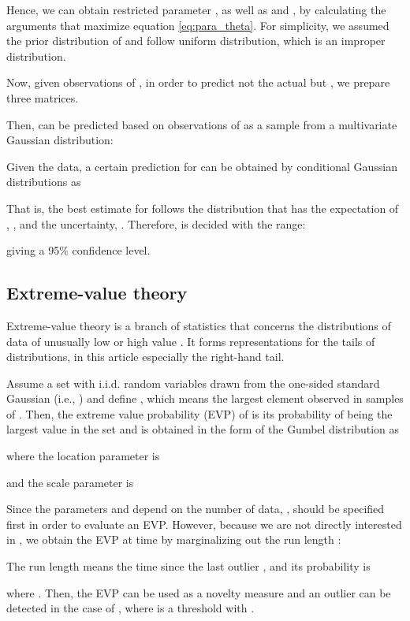\documentclass[final,authoryear,5p,times,twocolumn]{elsarticle}
\begin{document}
Hence, we can obtain restricted parameter , as well as  and , by calculating the arguments that maximize equation \eqref{eq:para_theta}. For simplicity, we assumed the prior distribution of  and  follow uniform distribution, which is an improper distribution.

Now, given  observations of , in order to predict not the actual  but , we prepare three matrices.
 

Then,  can be predicted based on  observations of  as a sample from a multivariate Gaussian distribution:

Given the data, a certain prediction for  can be obtained by conditional Gaussian distributions as

That is, the best estimate for  follows the distribution that has the expectation of , , and the uncertainty, . Therefore, is decided with the range:

giving a 95\% confidence level.



\subsection{Extreme-value theory}
\label{section:Sec3.3}
Extreme-value theory is a branch of statistics that concerns the distributions of data of unusually low or high value \citep{ref23}. It forms representations for the tails of distributions, in this article especially the right-hand tail.

Assume a set  with  i.i.d. random variables drawn from the one-sided standard Gaussian (i.e.,  ) and define , which means the largest element observed in  samples of . Then, the extreme value probability (EVP) of  is its probability of  being the largest value in the set and is obtained in the form of the Gumbel distribution as \citep{ref23, ref24}

where the location parameter is

and the scale parameter is


Since the parameters  and  depend on the number of data, ,  should be specified first in order to evaluate an EVP. However, because we are not directly interested in , we obtain the EVP at time  by marginalizing out the run length  \citep{ref24}:

The run length  means the time since the last outlier \citep{ref25}, and its probability \citep{ref24} is 

where . Then, the EVP can be used as a novelty measure and an outlier can be detected in the case of , where  is a threshold with  \citep{ref24}.
\end{document}

